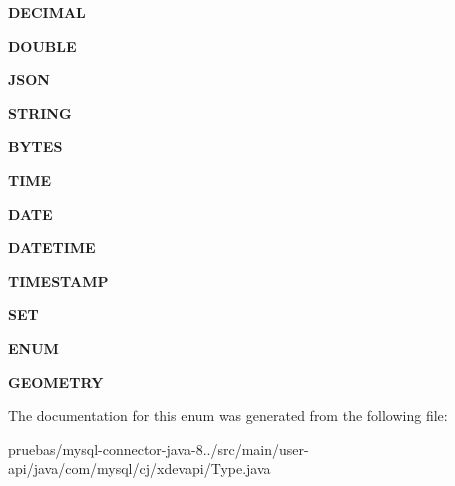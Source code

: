 \begin{DoxyCompactItemize}
{\bfseries D\+E\+C\+I\+M\+AL}
\item 
\mbox{\label{enumcom_1_1mysql_1_1cj_1_1xdevapi_1_1_type_a5002ae30d79b4a18b2311f95f83c7f07}} 
{\bfseries D\+O\+U\+B\+LE}
\item 
\mbox{\label{enumcom_1_1mysql_1_1cj_1_1xdevapi_1_1_type_a64b8b33d18409ead229841bc9195e653}} 
{\bfseries J\+S\+ON}
\item 
\mbox{\label{enumcom_1_1mysql_1_1cj_1_1xdevapi_1_1_type_a0749d7b4880cbccca7e951b7ffdc5f4b}} 
{\bfseries S\+T\+R\+I\+NG}
\item 
\mbox{\label{enumcom_1_1mysql_1_1cj_1_1xdevapi_1_1_type_a945339018df1b7ba556def7fcd71f2d3}} 
{\bfseries B\+Y\+T\+ES}
\item 
\mbox{\label{enumcom_1_1mysql_1_1cj_1_1xdevapi_1_1_type_aeb9d3c4f13ced97b450e2f2ea833dc19}} 
{\bfseries T\+I\+ME}
\item 
\mbox{\label{enumcom_1_1mysql_1_1cj_1_1xdevapi_1_1_type_aab43e5873a8cf2e20b6fcf6febc7b762}} 
{\bfseries D\+A\+TE}
\item 
\mbox{\label{enumcom_1_1mysql_1_1cj_1_1xdevapi_1_1_type_afa9722b757f69347c6a9865e47590e99}} 
{\bfseries D\+A\+T\+E\+T\+I\+ME}
\item 
\mbox{\label{enumcom_1_1mysql_1_1cj_1_1xdevapi_1_1_type_a89eac0e7bda62933c6e45cc78e6bb3dc}} 
{\bfseries T\+I\+M\+E\+S\+T\+A\+MP}
\item 
\mbox{\label{enumcom_1_1mysql_1_1cj_1_1xdevapi_1_1_type_ad0a84c95791e485d5336699e01bb7229}} 
{\bfseries S\+ET}
\item 
\mbox{\label{enumcom_1_1mysql_1_1cj_1_1xdevapi_1_1_type_a4032058edeb64defeb355ed2d1c67fff}} 
{\bfseries E\+N\+UM}
\item 
\mbox{\label{enumcom_1_1mysql_1_1cj_1_1xdevapi_1_1_type_a02bbafd70fb2c78619d42b3deaaa3a34}} 
{\bfseries G\+E\+O\+M\+E\+T\+RY}
\end{DoxyCompactItemize}


The documentation for this enum was generated from the following file\+:\begin{DoxyCompactItemize}
\item 
pruebas/mysql-\/connector-\/java-\/8../src/main/user-\/api/java/com/mysql/cj/xdevapi/Type.\+java\end{DoxyCompactItemize}
